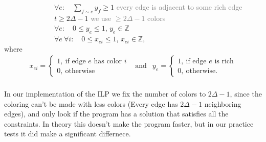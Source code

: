 \documentclass[12pt,a4paper]{amsart}
\theoremstyle{definition} %
\theoremstyle{plain} %
\newcommand{\Z}{\mathbb Z}
\begin{document}
        \ \ \ \ \ \ \ \ \ \ \ \ \ \ $\forall e: \quad \sum_{f \sim e}y_f \geq 1$ \hfill \textcolor{gray}{every edge is adjacent to some rich edge}\\

        \ \ \ \ \ \ \ \ \ \ \ \ \ \ $t \geq 2 \Delta - 1$ \hfill \textcolor{gray}{we use $\geq 2 \Delta - 1$ colors}\\

        \ \ \ \ \ \ \ \ \ \ \ \ \ \ $\forall e: \quad 0 \leq y_{e} \leq 1$, $y_{e} \in \Z$\\

        \ \ \ \ \ \ \ \ \ \ \ \ \ \ $\forall e \ \forall i: \quad 0 \leq x_{ei} \leq 1$, $x_{ei} \in \Z$,\\

        where
        \begin{align*}        x_{ei} = \begin{cases}
                    1, \  \text{if edge $e$ has color $i$} \\
                    0, \  \text{otherwise}
            \end{cases} & \text{and} & 
            y_{e} = \begin{cases}
                1, \  \text{if edge $e$ is rich} \\
                0, \  \text{otherwise.}
            \end{cases}
        \end{align*}\\


        In our implementation of the ILP we fix the number of colors to $2 \Delta - 1$, since the coloring can't be made with less colors (Every edge has $2 \Delta - 1$ neighboring edges), and only look if the program has a solution that satisfies all the constraints. In theory this doesn't make the program faster, but in our practice tests it did make a significant differnece.\\
\end{document}
